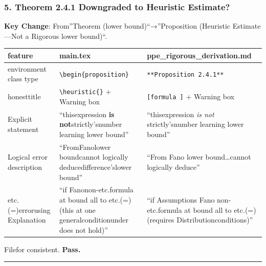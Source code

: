 \documentclass[
  12pt,
]{article}
\begin{document}
\subsubsection{5. Theorem 2.4.1
Downgraded to Heuristic Estimate?}\label{ux5b9aux7406-2.4.1-ux662fux5426ux5df2ux964dux7ea7ux4e3aux542fux53d1ux5f0fux4f30ux8ba1}

\textbf{Key Change}:
From''Theorem (lower bound)``→''Proposition (Heuristic Estimate---Not a Rigorous lower bound)``. 

\begin{longtable}[]{@{}
  >{\raggedright\arraybackslash}p{}
  >{\raggedright\arraybackslash}p{}
  >{\raggedright\arraybackslash}p{}@{}}
\toprule\noalign{}
\begin{minipage}[b]{\linewidth}\raggedright
feature
\end{minipage} & \begin{minipage}[b]{\linewidth}\raggedright
main.tex
\end{minipage} & \begin{minipage}[b]{\linewidth}\raggedright
ppe\_rigorous\_derivation.md
\end{minipage} \\
\midrule\noalign{}
\endhead
\bottomrule\noalign{}
\endlastfoot
environment class type  & \texttt{\textbackslash{}begin\{proposition\}} &
\texttt{**Proposition\ 2.4.1**} \\
honesttitle  & \texttt{\textbackslash{}heuristic\{\}} + Warning box &
\texttt{{[}formula {]}} + Warning box \\
Explicit statement & ``thisexpression \textbf{is not}strictly'snumber learning lower bound'' & ``thisexpression 
\emph{is not} strictly'snumber learning lower bound'' \\
Logical error description  & ``FromFanolower boundcannot logically deducedifference'slower bound'' & ``From Fano
lower bound\ldots cannot logically deduce'' \\
etc.(=)errorusing Explanation &
``if Fanonon-etc.formula at bound all to etc.(=)(this at one generalconditionunder does not hold)'' & ``if Assumptions
Fano non-etc.formula at bound all to etc.(=)(requires Distributionconditions)'' \\
\end{longtable}

Filefor consistent. \textbf{Pass.}

\begin{center}\rule{0.5\linewidth}{0.5pt}\end{center}
\end{document}
